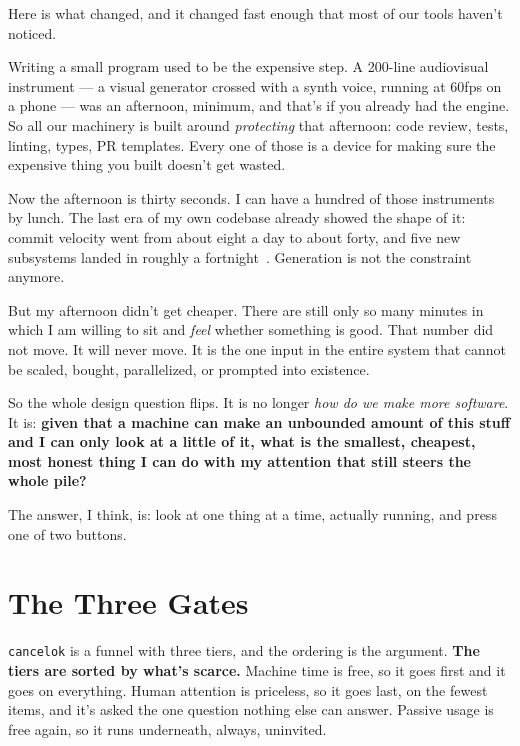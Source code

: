 \documentclass[10pt,letterpaper,twocolumn]{article}
\begin{document}
Here is what changed, and it changed fast enough that most of our tools haven't noticed.

Writing a small program used to be the expensive step. A 200-line audiovisual instrument --- a visual generator crossed with a synth voice, running at 60fps on a phone --- was an afternoon, minimum, and that's if you already had the engine. So all our machinery is built around \emph{protecting} that afternoon: code review, tests, linting, types, PR templates. Every one of those is a device for making sure the expensive thing you built doesn't get wasted.

Now the afternoon is thirty seconds. I can have a hundred of those instruments by lunch. The last era of my own codebase already showed the shape of it: commit velocity went from about eight a day to about forty, and five new subsystems landed in roughly a fortnight~\citep{scudder2026handloop}. Generation is not the constraint anymore.

But my afternoon didn't get cheaper. There are still only so many minutes in which I am willing to sit and \emph{feel} whether something is good. That number did not move. It will never move. It is the one input in the entire system that cannot be scaled, bought, parallelized, or prompted into existence.

So the whole design question flips. It is no longer \emph{how do we make more software}. It is: \textbf{given that a machine can make an unbounded amount of this stuff and I can only look at a little of it, what is the smallest, cheapest, most honest thing I can do with my attention that still steers the whole pile?}

The answer, I think, is: look at one thing at a time, actually running, and press one of two buttons.


\section{The Three Gates}

\texttt{cancelok} is a funnel with three tiers, and the ordering is the argument. \textbf{The tiers are sorted by what's scarce.} Machine time is free, so it goes first and it goes on everything. Human attention is priceless, so it goes last, on the fewest items, and it's asked the one question nothing else can answer. Passive usage is free again, so it runs underneath, always, uninvited.
\end{document}
